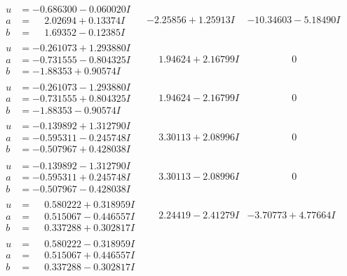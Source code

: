 \documentclass[1p]{elsarticle_modified}
\theoremstyle{definition}
\begin{document}
$$\begin{array}{c|c|c}
\begin{aligned}
u &= -0.686300 - 0.060020 I \\
a &= \phantom{-}2.02694 + 0.13374 I \\
b &= \phantom{-}1.69352 - 0.12385 I\end{aligned}
 & -2.25856 + 1.25913 I & -10.34603 - 5.18490 I \\ \hline\begin{aligned}
u &= -0.261073 + 1.293880 I \\
a &= -0.731555 - 0.804325 I \\
b &= -1.88353 + 0.90574 I\end{aligned}
 & \phantom{-}1.94624 + 2.16799 I & \phantom{-0.000000 } 0 \\ \hline\begin{aligned}
u &= -0.261073 - 1.293880 I \\
a &= -0.731555 + 0.804325 I \\
b &= -1.88353 - 0.90574 I\end{aligned}
 & \phantom{-}1.94624 - 2.16799 I & \phantom{-0.000000 } 0 \\ \hline\begin{aligned}
u &= -0.139892 + 1.312790 I \\
a &= -0.595311 - 0.245748 I \\
b &= -0.507967 + 0.428038 I\end{aligned}
 & \phantom{-}3.30113 + 2.08996 I & \phantom{-0.000000 } 0 \\ \hline\begin{aligned}
u &= -0.139892 - 1.312790 I \\
a &= -0.595311 + 0.245748 I \\
b &= -0.507967 - 0.428038 I\end{aligned}
 & \phantom{-}3.30113 - 2.08996 I & \phantom{-0.000000 } 0 \\ \hline\begin{aligned}
u &= \phantom{-}0.580222 + 0.318959 I \\
a &= \phantom{-}0.515067 - 0.446557 I \\
b &= \phantom{-}0.337288 + 0.302817 I\end{aligned}
 & \phantom{-}2.24419 - 2.41279 I & -3.70773 + 4.77664 I \\ \hline\begin{aligned}
u &= \phantom{-}0.580222 - 0.318959 I \\
a &= \phantom{-}0.515067 + 0.446557 I \\
b &= \phantom{-}0.337288 - 0.302817 I\end{aligned}

\end{array}$$
\end{document}
